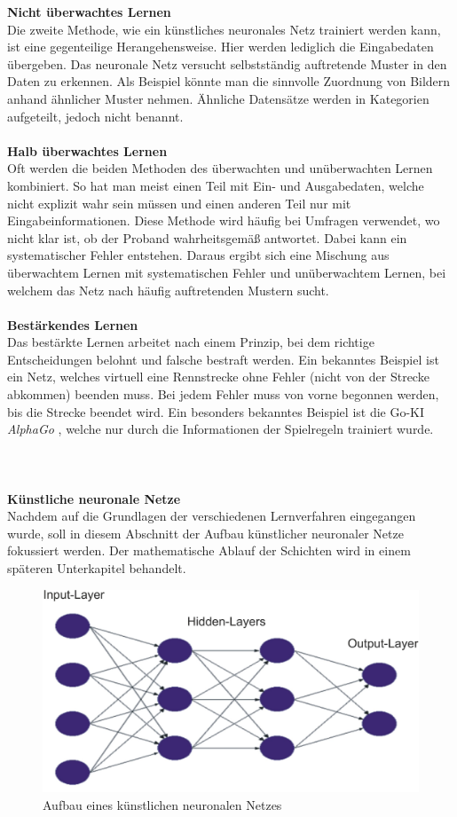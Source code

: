 \textbf{Nicht überwachtes Lernen}\\
Die zweite Methode, wie ein künstliches neuronales Netz trainiert werden kann, ist eine gegenteilige Herangehensweise. Hier werden lediglich die Eingabedaten übergeben. Das neuronale Netz versucht selbstständig auftretende Muster in den Daten zu erkennen. Als Beispiel könnte man die sinnvolle Zuordnung von Bildern anhand ähnlicher Muster nehmen. Ähnliche Datensätze werden in Kategorien aufgeteilt, jedoch nicht benannt.\\\\
\textbf{Halb überwachtes Lernen}\\
Oft werden die beiden Methoden des überwachten und unüberwachten Lernen kombiniert. So hat man meist einen Teil mit Ein- und Ausgabedaten, welche nicht explizit wahr sein müssen und einen anderen Teil nur mit Eingabeinformationen. Diese Methode wird häufig bei Umfragen verwendet, wo nicht klar ist, ob der Proband wahrheitsgemäß antwortet. Dabei kann ein systematischer Fehler entstehen. Daraus ergibt sich eine Mischung aus überwachtem Lernen mit systematischen Fehler und unüberwachtem Lernen, bei welchem das Netz nach häufig auftretenden Mustern sucht.\\\\
\textbf{Bestärkendes Lernen}\\ 
Das bestärkte Lernen arbeitet nach einem Prinzip, bei dem richtige Entscheidungen belohnt und falsche bestraft werden. Ein bekanntes Beispiel ist ein Netz, welches virtuell eine Rennstrecke ohne Fehler (nicht von der Strecke abkommen) beenden muss. Bei jedem Fehler muss von vorne begonnen werden, bis die Strecke beendet wird. Ein besonders bekanntes Beispiel ist die Go-KI \textit{AlphaGo} \cite{Alpha2016GO}, welche nur durch die Informationen der Spielregeln trainiert wurde.\\\\\\\\
\textbf{Künstliche neuronale Netze}\\
Nachdem auf die Grundlagen der verschiedenen Lernverfahren eingegangen wurde, soll in diesem Abschnitt der Aufbau künstlicher neuronaler Netze fokussiert werden. Der mathematische Ablauf der Schichten wird in einem späteren Unterkapitel behandelt.\\
\begin{figure}
	[h]
	\centering
	\includegraphics[scale=0.5]{Sources/nnet.png}
	\caption{Aufbau eines künstlichen neuronalen Netzes \cite{bistra2018pic}}
	\label{img:neuronales_netz}
\end{figure}\\
